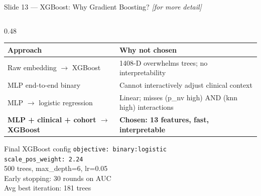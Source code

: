 \documentclass[aspectratio=169, 9pt]{beamer}
\begin{document}
\begin{frame}{Slide 13 --- XGBoost: Why Gradient Boosting? \hfill{\small\textit{[for more detail]}}}
\begin{columns}[T]
\begin{column}{0.48\textwidth}
      \vspace{0.3em}
      {\small
      \begin{tabular}{@{} p{3.0cm} p{3.2cm} @{}}
        \toprule
        Approach & Why not chosen \\
        \midrule
        Raw embedding $\to$ XGBoost
          & 1408-D overwhelms trees; no interpretability \\
        \addlinespace
        MLP end-to-end binary
          & Cannot interactively adjust clinical context \\
        \addlinespace
        MLP $\to$ logistic regression
          & Linear; misses (p\_nv high) AND (knn high) interactions \\
        \addlinespace
        \textbf{MLP + clinical + cohort $\to$ XGBoost}
          & \textbf{Chosen: 13 features, fast, interpretable} \\
        \bottomrule
      \end{tabular}
      }

      \vspace{0.4em}
      \begin{exampleblock}{Final XGBoost config}
        \small
        \texttt{objective: binary:logistic}\\
        \texttt{scale\_pos\_weight: 2.24}\\
        500 trees, max\_depth=6, lr=0.05\\
        Early stopping: 30 rounds on AUC\\
        Avg best iteration: 181 trees
      \end{exampleblock}
    \end{column}

  \end{columns}
\end{frame}
\end{document}
